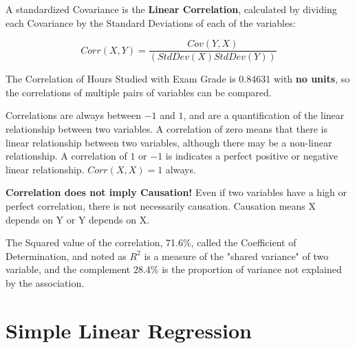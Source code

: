 \documentclass[nohyper,justified]{tufte-handout}\usepackage[]{graphicx}\usepackage[]{color}
\begin{document}
A standardized Covariance is the \textbf{Linear Correlation}, calculated by dividing each Covariance by the Standard Deviations of each of the variables:

\begin{equation*}
Corr(X,Y)=\frac{Cov(Y,X)}{(StdDev(X)StdDev(Y))}
\end{equation*}

The Correlation of Hours Studied with Exam Grade is 0.84631 with \textbf{no units}, so the correlations of multiple pairs of variables can be compared.

Correlations are always between $-1$ and $1$, and are a quantification of the linear relationship between two variables. A correlation of zero means that there is linear relationship between two variables, although there may be a non-linear relationship. A correlation of $1$ or $-1$ is indicates a perfect positive or negative linear relationship. $Corr(X,X)=1$ always.

\textbf{Correlation does not imply Causation!} Even if two variables have a high or perfect correlation, there is not necessarily causation. Causation means X depends on Y or Y depends on X. 

The Squared value of the correlation, 71.6\%, called the Coefficient of Determination, and noted as $R^2$ is a measure of the "shared variance" of two variable, and the complement 28.4\% is the proportion of variance not explained by the association.

\section{Simple Linear Regression}
\end{document}
